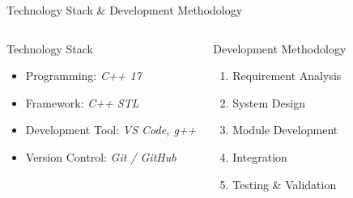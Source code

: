 \documentclass[aspectratio=169,11pt]{beamer}
\newcommand{\smallnote}[1]{%
\vspace{0.08cm}
{\scriptsize\color{GEUGrey}#1}
}
\newcommand{\placeholder}[1]{%
\textit{\color{GEUGrey}#1}
}
\begin{document}
\begin{frame}{Technology Stack \& Development Methodology}

\begin{columns}[T,totalwidth=\textwidth]


\begin{block}{Technology Stack}

\begin{itemize}\itemsep2pt
\item Programming: \placeholder{C++ 17}
\item Framework: \placeholder{C++ STL}
\item Development Tool: \placeholder{VS Code, g++}
\item Version Control: \placeholder{Git / GitHub}
\end{itemize}

\end{block}


\begin{block}{Development Methodology}

\begin{enumerate}\itemsep2pt
\item Requirement Analysis
\item System Design
\item Module Development
\item Integration
\item Testing \& Validation
\end{enumerate}

\end{block}

\end{columns}

\vfill


\end{frame}
\end{document}

